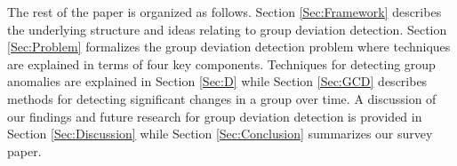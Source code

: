 {%
The rest of the paper is organized as follows. Section \ref{Sec:Framework} describes the underlying structure and ideas relating to group deviation detection.  Section \ref{Sec:Problem}  formalizes the group deviation detection problem where techniques are explained in terms of four key components. Techniques for detecting group anomalies are explained in Section  \ref{Sec:D} while Section \ref{Sec:GCD}  describes methods for detecting significant changes in a group over time. A discussion of our findings and future research for group deviation detection is provided in Section 
 \ref{Sec:Discussion} while Section \ref{Sec:Conclusion} summarizes our survey paper.
}
 
